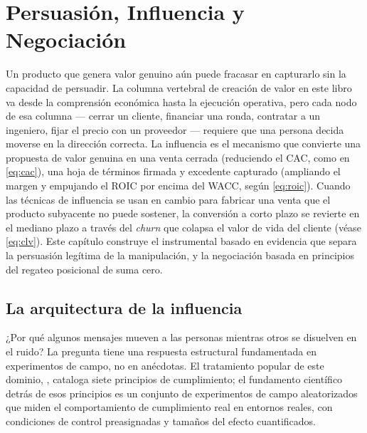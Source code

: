 \chapter{Persuasión, Influencia y Negociación}\label{ch:persuasion-influence}


Un producto que genera valor genuino aún puede fracasar en capturarlo sin la capacidad de
persuadir. La columna vertebral de creación de valor en este libro va desde la comprensión
económica hasta la ejecución operativa, pero cada nodo de esa columna --- cerrar un cliente,
financiar una ronda, contratar a un ingeniero, fijar el precio con un proveedor --- requiere
que una persona decida moverse en la dirección correcta. La influencia es el mecanismo que
convierte una propuesta de valor genuina en una venta cerrada (reduciendo el CAC, como en
\cref{eq:cac}), una hoja de términos firmada y excedente capturado (ampliando el margen y
empujando el ROIC por encima del WACC, según \cref{eq:roic}). Cuando las técnicas de
influencia se usan en cambio para fabricar una venta que el producto subyacente no puede
sostener, la conversión a corto plazo se revierte en el mediano plazo a través del \emph{churn}
que colapsa el valor de vida del cliente (véase \cref{eq:clv}). Este capítulo construye el
instrumental basado en evidencia que separa la persuasión legítima de la manipulación, y la
negociación basada en principios del regateo posicional de suma cero.


\section{La arquitectura de la influencia}\label{sec:influence-principles}

¿Por qué algunos mensajes mueven a las personas mientras otros se disuelven en el ruido? La
pregunta tiene una respuesta estructural fundamentada en experimentos de campo, no en
anécdotas. El tratamiento popular de este dominio, \textcite{cialdini2021influence}, cataloga
siete principios de cumplimiento; el fundamento científico detrás de esos principios es un
conjunto de experimentos de campo aleatorizados que miden el comportamiento de cumplimiento
real en entornos reales, con condiciones de control preasignadas y tamaños del efecto
cuantificados.

